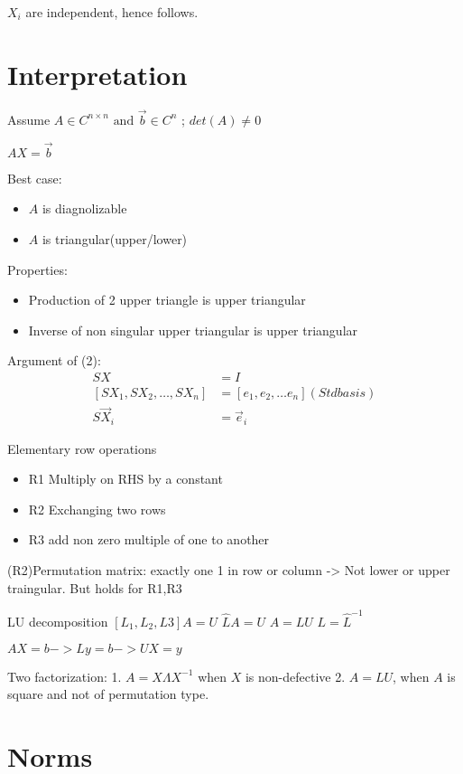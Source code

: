 \documentclass{article}
\begin{document}
$X_i$ are independent, hence follows.

\section{Interpretation}
Assume $A \in C^{n \times n} \text{ and } \vec{b} \in C^n$ ; $det(A) \neq 0$

$AX = \vec{b}$

Best case:
\begin{itemize}
\item $A$ is diagnolizable
\item $A$ is triangular(upper/lower)
\end{itemize}

Properties:
\begin{itemize}
\item Production of 2 upper triangle is upper triangular
\item Inverse of non singular upper triangular is upper triangular
\end{itemize}

Argument of (2):
\begin{align*}
SX &= I\\
[SX_1, SX_2, \dots, SX_n] &= [e_1,e_2, \dots e_n] (Std basis)\\
S\vec{X}_i &= \vec{e}_i
\end{align*}

Elementary row operations

\begin{itemize}
\item R1 Multiply on RHS by a constant
\item R2 Exchanging two rows
\item R3 add non zero multiple of one to another
\end{itemize}

(R2)Permutation matrix: exactly one 1 in row or column -> Not lower or upper traingular. But holds for R1,R3



LU decomposition $[L_1, L_2,L3]A = U$ $\hat{L}A = U$
$A = LU$
$L=\hat{L}^{-1}$

$AX =b -> Ly= b -> UX=y$

Two factorization:
1. $A = X\Lambda X^{-1}$ when $X$ is non-defective
2. $A = LU$, when $A$ is square and not of permutation type.


\section{Norms}
\end{document}
